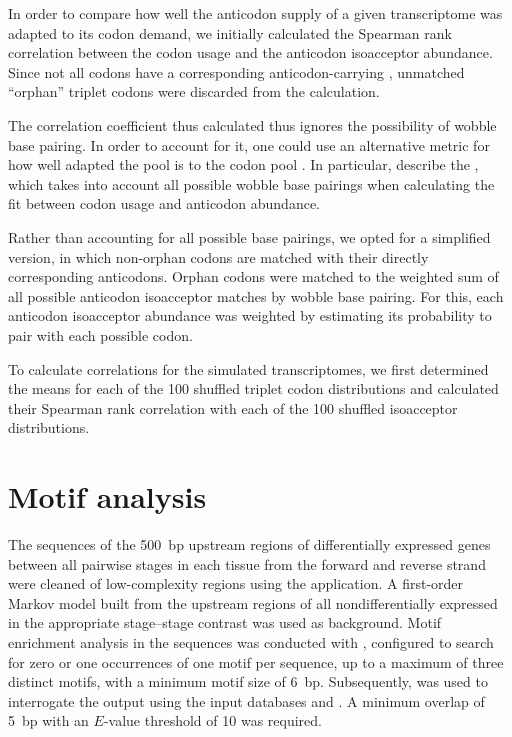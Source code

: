 In order to compare how well the anticodon supply of a given transcriptome was
adapted to its codon demand, we initially calculated the Spearman rank
correlation between the codon usage and the anticodon isoacceptor abundance.
Since not all codons have a corresponding anticodon-carrying \trna, unmatched
“orphan” triplet codons were discarded from the calculation.

The correlation coefficient thus calculated thus ignores the possibility of
wobble base pairing. In order to account for it, one could use an alternative
metric for how well adapted the \trna pool is to the codon pool
\citep{Gingold:2011}. In particular, \citet{Dos_Reis:2004} describe the \tai,
which takes into account all possible wobble base pairings when calculating the
fit between codon usage and anticodon abundance.

Rather than accounting for all possible base pairings, we opted for a simplified
version, in which non-orphan codons are matched with their directly
corresponding anticodons. Orphan codons were matched to the weighted sum of all
possible \trna anticodon isoacceptor matches by wobble base pairing. For this,
each anticodon isoacceptor abundance was weighted by estimating its probability
to pair with each possible codon.

To calculate correlations for the simulated transcriptomes, we first determined
the means for each of the \num{100} shuffled triplet codon distributions and
calculated their Spearman rank correlation with each of the \num{100} shuffled
isoacceptor distributions.

\section{Motif analysis}

The sequences of the \SI{500}{bp} upstream regions of differentially expressed
\trna genes between all pairwise stages in each tissue from the forward and
reverse strand were cleaned of low-complexity regions using the 
application. A first-order Markov model built from the upstream regions of
all nondifferentially expressed \trna[s] in the appropriate stage–stage contrast
was used as background. Motif enrichment analysis in the sequences was conducted
with  \citep{Bailey:2009}, configured to search for zero or one
occurrences of one motif per sequence, up to a maximum of three distinct motifs,
with a minimum motif size of \SI{6}{bp}. Subsequently, 
\citep{Gupta:2007} was used to interrogate the  output using the
input databases  and
. A minimum overlap of \SI{5}{bp} with an
\(E\)-value threshold of \num{10} was required.

